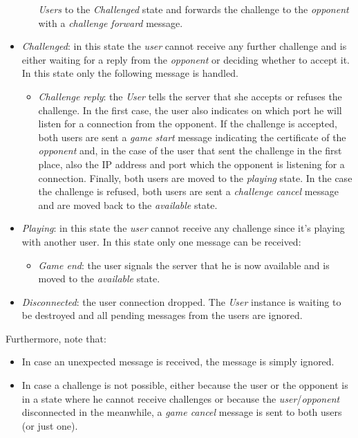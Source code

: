 \begin{itemize}
\begin{itemize}
                \emph{Users} to the \emph{Challenged} state and forwards the 
                challenge to the \emph{opponent} with a \emph{challenge forward}
                message.
        \end{itemize}
    \item \emph{Challenged}: in this state the \emph{user} cannot receive any 
        further challenge and is either waiting for a reply from the 
        \emph{opponent} or deciding whether to accept it. In this state only 
        the following message is handled.
        \begin{itemize}
            \item \emph{Challenge reply}: the \emph{User} tells the server that
                she accepts or refuses the challenge. In the first case, 
                the user also indicates on which port he will listen for a 
                connection from the opponent. If the challenge is accepted, 
                both users are sent a \emph{game start} message indicating 
                the certificate of the \emph{opponent} and, in the case of 
                the user that sent the challenge in the first place, also 
                the IP address and port which the opponent is listening for 
                a connection. Finally, both users are moved to the 
                \emph{playing} state. In the case the challenge is refused, 
                both users are sent a \emph{challenge cancel} message and 
                are moved back to the \emph{available} state.
        \end{itemize}
    \item \emph{Playing}: in this state the \emph{user} cannot receive any 
        challenge since it's playing with another user. In this state only 
        one message can be received:
        \begin{itemize}
            \item \emph{Game end}: the user signals the server that he is now 
                available and is moved to the \emph{available} state.
        \end{itemize}
    \item \emph{Disconnected}: the user connection dropped. The \emph{User}
        instance is waiting to be destroyed and all pending messages from the 
        users are ignored.
\end{itemize}

Furthermore, note that:
\begin{itemize}
    \item In case an unexpected message is received, the message is simply 
        ignored. 
    \item In case a challenge is not possible, either because the user or the   
        opponent is in a state where he cannot receive challenges or because 
        the \emph{user}/\emph{opponent} disconnected in the meanwhile, 
        a \emph{game cancel} message is sent to both users (or just one).
\end{itemize}

